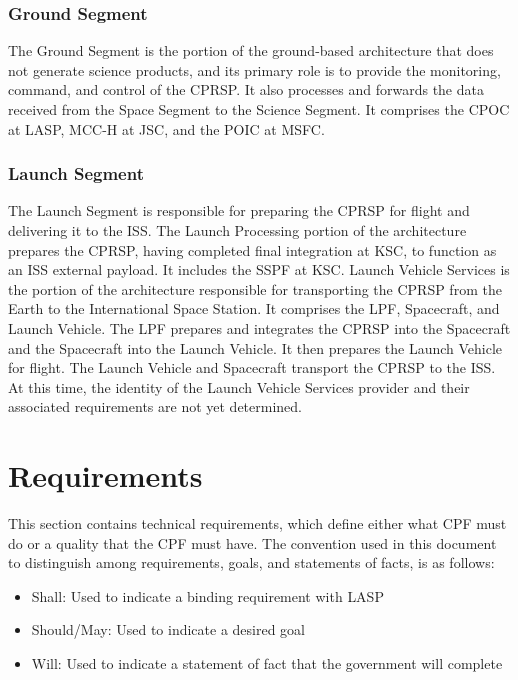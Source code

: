\documentclass[12pt,oneside,oldfontcommands]{memoir}
\begin{document}
\subsection{Ground Segment }
\label{groundsegment}

The Ground Segment is the portion of the ground-based architecture that does not generate science products, and its primary role is to provide the monitoring, command, and control of the \gls{CPRSP}. It also processes and forwards the data received from the Space Segment to the Science Segment. It comprises the \gls{CPOC} at \gls{LASP}, \gls{MCC-H} at \gls{JSC}, and the \gls{POIC} at \gls{MSFC}.

\subsection{Launch Segment }
\label{launchsegment}

The Launch Segment is responsible for preparing the \gls{CPRSP} for flight and delivering it to the \gls{ISS}. The Launch Processing portion of the architecture prepares the \gls{CPRSP}, having completed final integration at \gls{KSC}, to function as an \gls{ISS} external payload. It includes the \gls{SSPF} at \gls{KSC}. Launch Vehicle Services is the portion of the architecture responsible for transporting the \gls{CPRSP} from the Earth to the International Space Station. It comprises the \gls{LPF}, Spacecraft, and Launch Vehicle. The \gls{LPF} prepares and integrates the \gls{CPRSP} into the Spacecraft and the Spacecraft into the Launch Vehicle. It then prepares the Launch Vehicle for flight. The Launch Vehicle and Spacecraft transport the \gls{CPRSP} to the \gls{ISS}. At this time, the identity of the Launch Vehicle Services provider and their associated requirements are not yet determined.

\chapter{Requirements  }
\label{sec_req}

\renewcommand\labelitemi{}

This section contains technical requirements, which define either what \gls{CPF} must do or a quality that the \gls{CPF} must have.
The convention used in this document to distinguish among requirements, goals, and statements of facts, is as follows:

\begin{itemize}
\item{} Shall: Used to indicate a binding requirement with \gls{LASP}

\item{} Should\slash May: Used to indicate a desired goal

\item{} Will: Used to indicate a statement of fact that the government will complete

\end{itemize}
\end{document}
